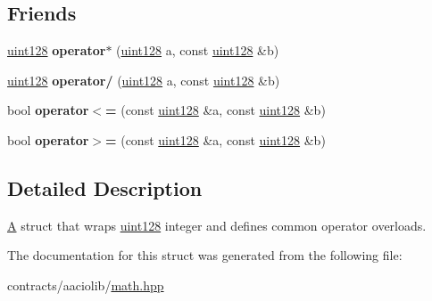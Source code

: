 \subsection*{Friends}
\begin{DoxyCompactItemize}
\item 
\mbox{\label{structaacio_1_1uint128_a35a742a797ca726ab2c74b8008479427}} 
\mbox{\hyperlink{structaacio_1_1uint128}{uint128}} {\bfseries operator$\ast$} (\mbox{\hyperlink{structaacio_1_1uint128}{uint128}} a, const \mbox{\hyperlink{structaacio_1_1uint128}{uint128}} \&b)
\item 
\mbox{\label{structaacio_1_1uint128_a91483b24e056b89304858c45a26eb75c}} 
\mbox{\hyperlink{structaacio_1_1uint128}{uint128}} {\bfseries operator/} (\mbox{\hyperlink{structaacio_1_1uint128}{uint128}} a, const \mbox{\hyperlink{structaacio_1_1uint128}{uint128}} \&b)
\item 
\mbox{\label{structaacio_1_1uint128_a83f2d787236426424fe4b36ef7dea6ac}} 
bool {\bfseries operator$<$=} (const \mbox{\hyperlink{structaacio_1_1uint128}{uint128}} \&a, const \mbox{\hyperlink{structaacio_1_1uint128}{uint128}} \&b)
\item 
\mbox{\label{structaacio_1_1uint128_a6c839778f4a9713eb58fb8f0305bc53e}} 
bool {\bfseries operator$>$=} (const \mbox{\hyperlink{structaacio_1_1uint128}{uint128}} \&a, const \mbox{\hyperlink{structaacio_1_1uint128}{uint128}} \&b)
\end{DoxyCompactItemize}


\subsection{Detailed Description}
\mbox{\hyperlink{struct_a}{A}} struct that wraps \mbox{\hyperlink{structaacio_1_1uint128}{uint128}} integer and defines common operator overloads. 

The documentation for this struct was generated from the following file\+:\begin{DoxyCompactItemize}
\item 
contracts/aaciolib/\mbox{\hyperlink{math_8hpp}{math.\+hpp}}\end{DoxyCompactItemize}

